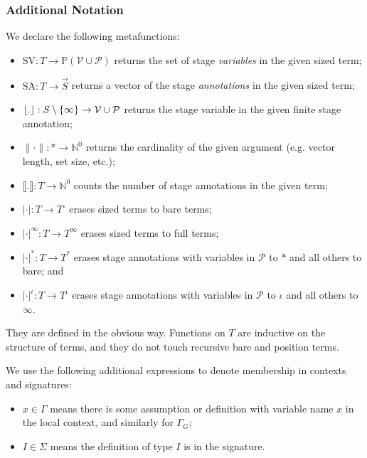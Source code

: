 \documentclass[sigplan,10pt,anonymous,review,nonacm]{acmart}
\begin{document}
\subsubsection{Additional Notation}

We declare the following metafunctions:

\begin{itemize}
    \item $\text{SV}: T \to \mathbb{P}(\mathcal{V} \cup \mathcal{P})$ returns the set of stage \textit{variables} in the given sized term;
    \item $\text{SA}: T \to \vec{S}$ returns a vector of the stage \textit{annotations} in the given sized term;
    \item $\lfloor . \rfloor: S \setminus \{\infty\} \to \mathcal{V} \cup \mathcal{P}$ returns the stage variable in the given finite stage annotation;
    \item $\|\cdot\|: * \to \mathbb{N}^0$ returns the cardinality of the given argument (e.g. vector length, set size, etc.);
    \item $\llbracket.\rrbracket: T \to \mathbb{N}^0$ counts the number of stage annotations in the given term;
    \item $|\cdot|: T \to T^\circ$ erases sized terms to bare terms;
    \item $|\cdot|^\infty: T \to T^\infty$ erases sized terms to full terms;
    \item $|\cdot|^*: T \to T^*$ erases stage annotations with variables in $\mathcal{P}$ to $*$ and all others to bare; and
    \item $|\cdot|^\iota: T \to T^\iota$ erases stage annotations with variables in $\mathcal{P}$ to $\iota$ and all others to $\infty$.
\end{itemize}

They are defined in the obvious way. Functions on $T$ are inductive on the structure of terms, and they do not touch recursive bare and position terms.

We use the following additional expressions to denote membership in contexts and signatures:

\begin{itemize}
    \item $x \in \Gamma$ means there is some assumption or definition with variable name $x$ in the local context, and similarly for $\Gamma_G$;
    \item $I \in \Sigma$ means the \coinductive definition of type $I$ is in the signature.
\end{itemize}
\end{document}
